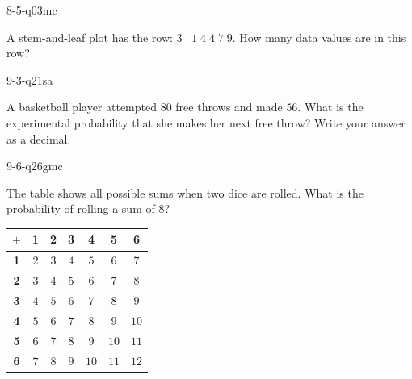 \begin{practiceQuestion}{8-5-q03}{mc}
\begin{questionText}
A stem-and-leaf plot has the row: $3 \mid 1\;4\;4\;7\;9$. How many data values are in this row?
\end{questionText}
\end{practiceQuestion}

\begin{practiceQuestion}{9-3-q21}{sa}
\begin{questionText}
A basketball player attempted $80$ free throws and made $56$. What is the experimental probability that she makes her next free throw? Write your answer as a decimal.
\end{questionText}
\end{practiceQuestion}

\begin{practiceQuestion}{9-6-q26}{gmc}
\begin{questionText}
The table shows all possible sums when two dice are rolled. What is the probability of rolling a sum of $8$?

\begin{center}
\begin{tabular}{|c|c|c|c|c|c|c|}
\hline
$+$ & \textbf{1} & \textbf{2} & \textbf{3} & \textbf{4} & \textbf{5} & \textbf{6} \\
\hline
\textbf{1} & $2$ & $3$ & $4$ & $5$ & $6$ & $7$ \\
\hline
\textbf{2} & $3$ & $4$ & $5$ & $6$ & $7$ & \cellcolor{funBlue!20}$8$ \\
\hline
\textbf{3} & $4$ & $5$ & $6$ & $7$ & \cellcolor{funBlue!20}$8$ & $9$ \\
\hline
\textbf{4} & $5$ & $6$ & $7$ & \cellcolor{funBlue!20}$8$ & $9$ & $10$ \\
\hline
\textbf{5} & $6$ & $7$ & \cellcolor{funBlue!20}$8$ & $9$ & $10$ & $11$ \\
\hline
\textbf{6} & $7$ & \cellcolor{funBlue!20}$8$ & $9$ & $10$ & $11$ & $12$ \\
\hline
\end{tabular}
\end{center}
\end{questionText}
\end{practiceQuestion}

